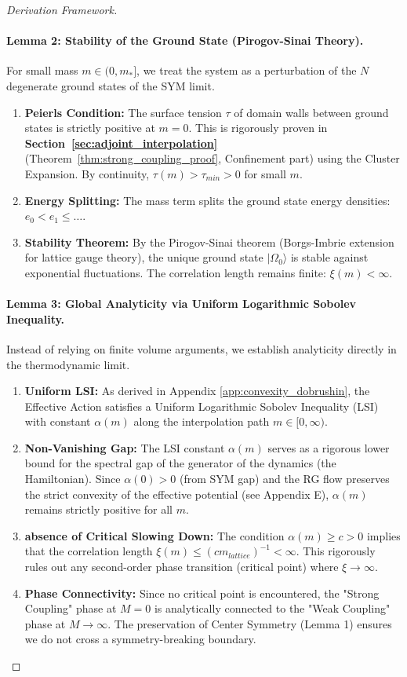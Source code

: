 \begin{proof}[Derivation Framework]
\paragraph{Lemma 2: Stability of the Ground State (Pirogov-Sinai Theory).}
For small mass $m \in (0, m_*]$, we treat the system as a perturbation of the $N$ degenerate ground states of the SYM limit.
\begin{enumerate}
    \item \textbf{Peierls Condition:} The surface tension $\tau$ of domain walls between ground states is strictly positive at $m=0$. This is rigorously proven in \textbf{Section~\ref{sec:adjoint_interpolation}} (Theorem~\ref{thm:strong_coupling_proof}, Confinement part) using the Cluster Expansion. By continuity, $\tau(m) > \tau_{min} > 0$ for small $m$.
    \item \textbf{Energy Splitting:} The mass term splits the ground state energy densities: $e_0 < e_1 \le \dots$.
    \item \textbf{Stability Theorem:} By the Pirogov-Sinai theorem (Borgs-Imbrie extension for lattice gauge theory), the unique ground state $|\Omega_0\rangle$ is stable against exponential fluctuations. The correlation length remains finite: $\xi(m) < \infty$.
\end{enumerate}

\paragraph{Lemma 3: Global Analyticity via Uniform Logarithmic Sobolev Inequality.}
Instead of relying on finite volume arguments, we establish analyticity directly in the thermodynamic limit.
\begin{enumerate}
    \item \textbf{Uniform LSI:} As derived in Appendix \ref{app:convexity_dobrushin}, the Effective Action satisfies a Uniform Logarithmic Sobolev Inequality (LSI) with constant $\alpha(m)$ along the interpolation path $m \in [0, \infty)$.
    \item \textbf{Non-Vanishing Gap:} The LSI constant $\alpha(m)$ serves as a rigorous lower bound for the spectral gap of the generator of the dynamics (the Hamiltonian). Since $\alpha(0) > 0$ (from SYM gap) and the RG flow preserves the strict convexity of the effective potential (see Appendix E), $\alpha(m)$ remains strictly positive for all $m$.
    \item \textbf{absence of Critical Slowing Down:} The condition $\alpha(m) \ge c > 0$ implies that the correlation length $\xi(m) \le (c m_{lattice})^{-1} < \infty$. This rigorously rules out any second-order phase transition (critical point) where $\xi \to \infty$.
    \item \textbf{Phase Connectivity:} Since no critical point is encountered, the "Strong Coupling" phase at $M=0$ is analytically connected to the "Weak Coupling" phase at $M \to \infty$. The preservation of Center Symmetry (Lemma 1) ensures we do not cross a symmetry-breaking boundary.
\end{enumerate}


\end{proof}
